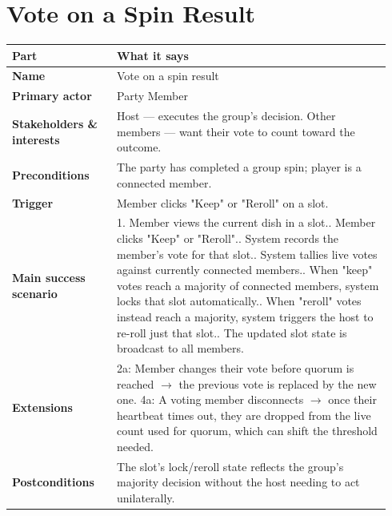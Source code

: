 \documentclass[11pt,twocolumn]{article}
\newcommand{\ucheader}{%
\textbf{Part} & \textbf{What it says} \\
\hline
\endhead
\hline
\endfoot
}
\begin{document}
\section{Vote on a Spin Result}
{\footnotesize
\begin{longtable}{@{}p{0.26\linewidth}p{0.68\linewidth}@{}}
\hline
\ucheader
\textbf{Name} & Vote on a spin result \\
\hline
\textbf{Primary actor} & Party Member \\
\hline
\textbf{Stakeholders \& interests} & Host --- executes the group's decision. Other members --- want their vote to count toward the outcome. \\
\hline
\textbf{Preconditions} & The party has completed a group spin; player is a connected member. \\
\hline
\textbf{Trigger} & Member clicks "Keep" or "Reroll" on a slot. \\
\hline
\textbf{Main success scenario} & 1. Member views the current dish in a slot.\newline
2. Member clicks "Keep" or "Reroll".\newline
3. System records the member's vote for that slot.\newline
4. System tallies live votes against currently connected members.\newline
5. When "keep" votes reach a majority of connected members, system locks that slot automatically.\newline
6. When "reroll" votes instead reach a majority, system triggers the host to re-roll just that slot.\newline
7. The updated slot state is broadcast to all members. \\
\hline
\textbf{Extensions} & 2a: Member changes their vote before quorum is reached $\rightarrow$ the previous vote is replaced by the new one.\newline
4a: A voting member disconnects $\rightarrow$ once their heartbeat times out, they are dropped from the live count used for quorum, which can shift the threshold needed. \\
\hline
\textbf{Postconditions} & The slot's lock/reroll state reflects the group's majority decision without the host needing to act unilaterally. \\
\hline
\end{longtable}
}
\end{document}
